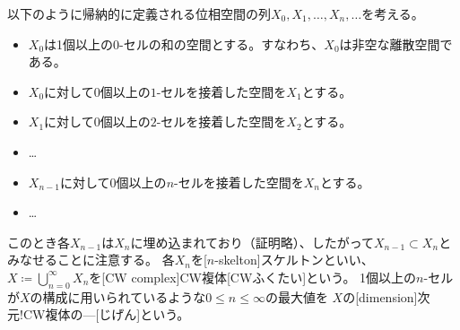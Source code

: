 \documentclass[report]{jlreq}
\begin{document}
\begin{definition}[CW複体]
    以下のように帰納的に定義される位相空間の列$X_0, X_1, \dots, X_n, \dots$を考える。
    \begin{itemize}
        \item $X_0$は1個以上の$0$-セルの和の空間とする。すなわち、$X_0$は非空な離散空間である。
        \item $X_0$に対して0個以上の$1$-セルを接着した空間を$X_1$とする。
        \item $X_1$に対して0個以上の$2$-セルを接着した空間を$X_2$とする。
        \item \dots
        \item $X_{n-1}$に対して0個以上の$n$-セルを接着した空間を$X_n$とする。
        \item \dots
    \end{itemize}
    このとき各$X_{n-1}$は$X_n$に埋め込まれており（証明略）、したがって$X_{n-1} \subset X_n$とみなせることに注意する。
    各$X_n$を[$n$-skelton]{スケルトン}といい、
    $X \coloneqq \bigcup_{n=0}^\infty X_n$を[CW complex]{CW複体}[CWふくたい]という。
    1個以上の$n$-セルが$X$の構成に用いられているような$0 \le n \le \infty$の最大値を
    $X$の[dimension]{次元!CW複体の---}[じげん]という。
\end{definition}

\end{document}
